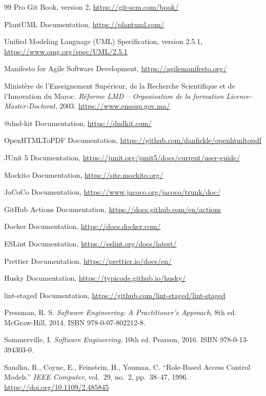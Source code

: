 \begin{thebibliography}{99}
Pro Git Book, version 2,
\url{https://git-scm.com/book/}

PlantUML Documentation,
\url{https://plantuml.com/}

Unified Modeling Language (UML) Specification, version 2.5.1,
\url{https://www.omg.org/spec/UML/2.5.1}

Manifesto for Agile Software Development,
\url{https://agilemanifesto.org/}

Ministère de l'Enseignement Supérieur, de la Recherche Scientifique et de l'Innovation du Maroc. \textit{Réforme LMD -- Organisation de la formation Licence-Master-Doctorat}, 2003.
\url{https://www.enssup.gov.ma/}

@dnd-kit Documentation,
\url{https://dndkit.com/}

OpenHTMLToPDF Documentation,
\url{https://github.com/danfickle/openhtmltopdf}

JUnit 5 Documentation,
\url{https://junit.org/junit5/docs/current/user-guide/}

Mockito Documentation,
\url{https://site.mockito.org/}

JaCoCo Documentation,
\url{https://www.jacoco.org/jacoco/trunk/doc/}

GitHub Actions Documentation,
\url{https://docs.github.com/en/actions}

Docker Documentation,
\url{https://docs.docker.com/}

ESLint Documentation,
\url{https://eslint.org/docs/latest/}

Prettier Documentation,
\url{https://prettier.io/docs/en/}

Husky Documentation,
\url{https://typicode.github.io/husky/}

lint-staged Documentation,
\url{https://github.com/lint-staged/lint-staged}

Pressman, R. S. \textit{Software Engineering: A Practitioner's Approach}, 8th ed. McGraw-Hill, 2014. ISBN 978-0-07-802212-8.

Sommerville, I. \textit{Software Engineering}, 10th ed. Pearson, 2016. ISBN 978-0-13-394303-0.

Sandhu, R., Coyne, E., Feinstein, H., Youman, C. ``Role-Based Access Control Models.'' \textit{IEEE Computer}, vol.~29, no.~2, pp.~38--47, 1996. \url{https://doi.org/10.1109/2.485845}


\end{thebibliography}

